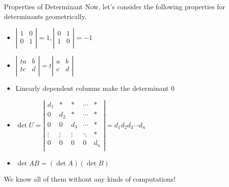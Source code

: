\documentclass{beamer}
\begin{document}
\begin{frame}{Properties of Determinant}
Now, let's consider the following properties for determinants geometrically.
\begin{itemize}
    \item $\left| \begin{matrix}
        1&		0\\
        0&		1\\
    \end{matrix} \right|=1, \left| \begin{matrix}
        0&		1\\
        1&		0\\
    \end{matrix} \right|=-1$
    \item $\left| \begin{matrix}
        ta&		b\\
        tc&		d\\
    \end{matrix} \right|=t\left| \begin{matrix}
        a&		b\\
        c&		d\\
    \end{matrix} \right|$
    \item Linearly dependent columns make the determinant 0
    \item $\det U=\left| \begin{matrix}
        d_1&		\ast&		\ast&		\cdots&		\ast\\
        0&		d_2&		\ast&		\cdots&		\ast\\
        0&		0&		d_3&		\cdots&		\ast\\
        \vdots&		\vdots&		\vdots&		\ddots&		\ast\\
        0&		0&		0&		0&		d_n\\
    \end{matrix} \right|=d_1d_2d_3\cdots d_n$
    \item $\det AB=\left( \det A \right) \left( \det B \right)$
\end{itemize}

We know all of them without any kinds of computations!
\end{frame}
\end{document}
